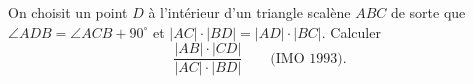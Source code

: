 On choisit un point $D$ à l'intérieur d'un triangle scalène $ABC$ de sorte que $\angle ADB = \angle ACB + 90^\circ$ et $|AC| \cdot |BD| = |AD| \cdot |BC|$. Calculer
\[ \frac{|AB| \cdot |CD|}{|AC| \cdot |BD|} \qquad \text{(IMO 1993).} \]
